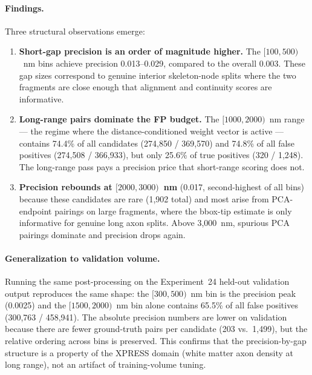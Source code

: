 \paragraph{Findings.}
Three structural observations emerge:

\begin{enumerate}
  \item \textbf{Short-gap precision is an order of magnitude higher.}
        The $[100, 500)$~nm bins achieve precision 0.013--0.029, compared to
        the overall 0.003.  These gap sizes correspond to genuine interior
        skeleton-node splits where the two fragments are close enough that
        alignment and continuity scores are informative.

  \item \textbf{Long-range pairs dominate the FP budget.}
        The $[1000, 2000)$~nm range --- the regime where the distance-conditioned
        weight vector is active --- contains 74.4\% of all candidates
        (274{,}850 / 369{,}570) and 74.8\% of all false positives
        (274{,}508 / 366{,}933), but only 25.6\% of true positives
        (320 / 1{,}248).  The long-range pass pays a precision price that
        short-range scoring does not.

  \item \textbf{Precision rebounds at $[2000, 3000)$~nm}
        (0.017, second-highest of all bins) because these candidates are rare
        (1{,}902 total) and most arise from PCA-endpoint pairings on large
        fragments, where the bbox-tip estimate is only informative for
        genuine long axon splits.  Above 3{,}000~nm, spurious PCA pairings
        dominate and precision drops again.
\end{enumerate}

\paragraph{Generalization to validation volume.}
Running the same post-processing on the Experiment~24 held-out validation
output reproduces the same shape: the $[300, 500)$~nm bin is the precision
peak (0.0025) and the $[1500, 2000)$~nm bin alone contains 65.5\% of all
false positives (300{,}763 / 458{,}941).  The absolute precision numbers
are lower on validation because there are fewer ground-truth pairs per
candidate (203 vs.\ 1{,}499), but the relative ordering across bins is
preserved.  This confirms that the precision-by-gap structure is a
property of the XPRESS domain (white matter axon density at long range),
not an artifact of training-volume tuning.

